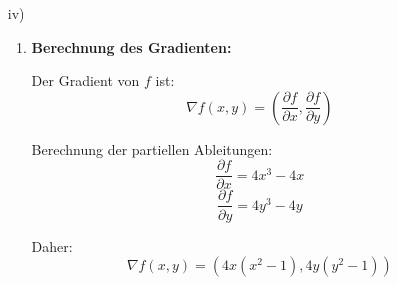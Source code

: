 {\begin{itemize}
\begin{enumerate}
Kritische Punkte treten dort auf, wo der Gradient Null ist:
\[
4x^3 - 4y = 0
\]
\[
4y^3 - 4x = 0
\]

Vereinfachung dieser Gleichungen:
\[
x^3 = y \quad \text{(1)}
\]
\[
y^3 = x \quad \text{(2)}
\]

Einsetzen von Gleichung (2) in Gleichung (1):
\[
(y^3)^3 = y \implies y^9 = y \implies y(y^8 - 1) = 0
\]

Auflösen nach $ y $:
\[
y = 0 \quad \text{oder} \quad y^8 = 1 \implies y = \pm 1
\]

Für $ y = 0 $:
\[
x^3 = 0 \implies x = 0
\]

Für $ y = 1 $:
\[
x^3 = 1 \implies x = 1
\]

Für $ y = -1 $:
\[
x^3 = -1 \implies x = -1
\]

Daher sind die kritischen Punkte $ (0, 0) $, $ (1, 1) $ und $ (-1, -1) $.

%
%
%
%
%
%
\end{enumerate}

\item[iv)]
\begin{enumerate}
\item \textbf{Berechnung des Gradienten:}

Der Gradient von $ f $ ist:
\[
\nabla f(x, y) = \left( \frac{\partial f}{\partial x}, \frac{\partial f}{\partial y} \right)
\]

Berechnung der partiellen Ableitungen:
\[
\frac{\partial f}{\partial x} = 4x^3 - 4x
\]
\[
\frac{\partial f}{\partial y} = 4y^3 - 4y
\]

Daher:
\[
\nabla f(x, y) = (4x(x^2 - 1), 4y(y^2 - 1))
\]


\end{enumerate}
\end{itemize}}
